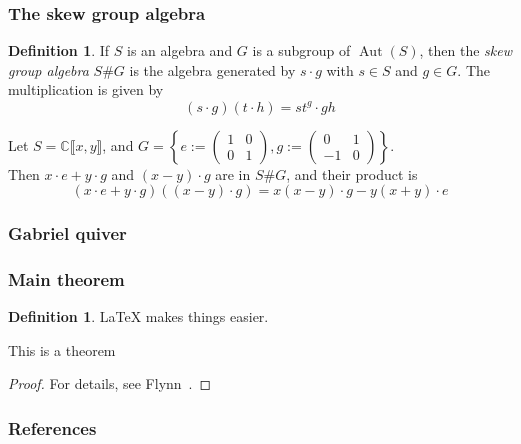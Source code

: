 \documentclass[screen, aspectratio=43]{beamer}
\theoremstyle{definition}
\newtheorem{defin}[theorem]{Definition}
\newcommand{\C}{\mathbb{C}}
\DeclareMathOperator{\Aut}{Aut}
\begin{document}
\begin{frame}
	\frametitle{The skew group algebra}
	\begin{defin}
		If $S$ is an algebra and $G$ is a subgroup of $\Aut(S)$, then the \textit{skew group algebra} $S\#G$ is the algebra generated by $s \cdot g$ with $s \in S$ and $g \in G$. The multiplication is given by $$(s \cdot g)(t \cdot h) = s t^g \cdot gh$$
	\end{defin}
	\begin{example}
		Let $S= \C \llbracket x, y \rrbracket$, and $G = \left\{ e:= \begin{pmatrix}
		1 & 0\\
		0 & 1
		\end{pmatrix}, g:= \begin{pmatrix}
		0 & 1\\
		-1 & 0
		\end{pmatrix} \right\}$. \\
		Then $x \cdot e + y\cdot g$ and $(x-y) \cdot g$ are in $S\#G$, and their product is $$(x \cdot e + y\cdot g)((x-y) \cdot g) = x(x-y) \cdot g - y(x+y) \cdot e$$
	\end{example}
\end{frame}

\begin{frame}
	\frametitle{Gabriel quiver}
\end{frame}

\begin{frame}
  \frametitle{Main theorem}
  \begin{defin}
    {\LaTeX} makes things easier.
  \end{defin}
  \begin{theorem}
  	This is a theorem 
  \begin{proof}
    For details, see Flynn~\cite{latex}.
  \end{proof}
  \end{theorem}
\end{frame}

\begin{frame}
  \frametitle{References}
  \printbibliography
\end{frame}
\end{document}
